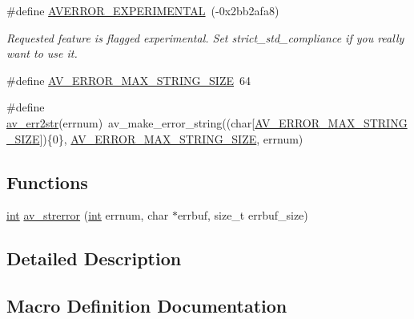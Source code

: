 \begin{DoxyCompactItemize}
\#define \hyperlink{group__lavu__error_ga3d2f16ec410d409c19e3547673b8469b}{A\+V\+E\+R\+R\+O\+R\+\_\+\+E\+X\+P\+E\+R\+I\+M\+E\+N\+T\+AL}~(-\/0x2bb2afa8)
\begin{DoxyCompactList}\small\item\em Requested feature is flagged experimental. Set strict\+\_\+std\+\_\+compliance if you really want to use it. \end{DoxyCompactList}\item 
\#define \hyperlink{group__lavu__error_ga326c3f741a7adb148cdeaad68eea713d}{A\+V\+\_\+\+E\+R\+R\+O\+R\+\_\+\+M\+A\+X\+\_\+\+S\+T\+R\+I\+N\+G\+\_\+\+S\+I\+ZE}~64
\item 
\#define \hyperlink{group__lavu__error_gac4f6e109c242c81aeee21868d3f35e12}{av\+\_\+err2str}(errnum)~av\+\_\+make\+\_\+error\+\_\+string((char\mbox{[}\hyperlink{group__lavu__error_ga326c3f741a7adb148cdeaad68eea713d}{A\+V\+\_\+\+E\+R\+R\+O\+R\+\_\+\+M\+A\+X\+\_\+\+S\+T\+R\+I\+N\+G\+\_\+\+S\+I\+ZE}\mbox{]})\{0\}, \hyperlink{group__lavu__error_ga326c3f741a7adb148cdeaad68eea713d}{A\+V\+\_\+\+E\+R\+R\+O\+R\+\_\+\+M\+A\+X\+\_\+\+S\+T\+R\+I\+N\+G\+\_\+\+S\+I\+ZE}, errnum)
\end{DoxyCompactItemize}
\subsection*{Functions}
\begin{DoxyCompactItemize}
\item 
\hyperlink{xmltok_8h_a5a0d4a5641ce434f1d23533f2b2e6653}{int} \hyperlink{group__lavu__error_ga5792b4a2d18d7d9cb0efbcfc335dce24}{av\+\_\+strerror} (\hyperlink{xmltok_8h_a5a0d4a5641ce434f1d23533f2b2e6653}{int} errnum, char $\ast$errbuf, size\+\_\+t errbuf\+\_\+size)
\end{DoxyCompactItemize}


\subsection{Detailed Description}


\subsection{Macro Definition Documentation}
